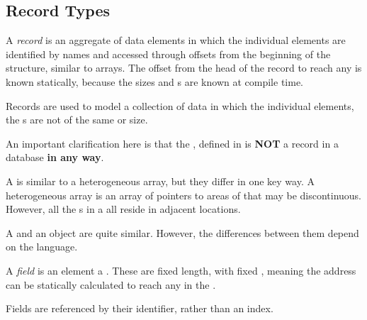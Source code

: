 \subsection{Record Types}\label{subsec:Record_Data_Types}
\begin{definition}[Record]\label{def:Record_Data_Type}
  A \emph{record} is an aggregate of data elements in which the individual elements are identified by names and accessed through offsets from the beginning of the structure, similar to arrays.
  The offset from the head of the record to reach any  is known statically, because the sizes and s are known at compile time.

  Records are used to model a collection of data in which the individual elements, the s are not of the same  or size.

  \begin{remark}[Clarification]
    An important clarification here is that the , defined in  is \textbf{NOT} a record in a database \textbf{in any way}.
  \end{remark}

  \begin{remark}
    A  is similar to a heterogeneous array, but they differ in one key way.
    A heterogeneous array is an array of pointers to areas of  that may be discontinuous.
    However, all the s in a  all reside in adjacent  locations.
  \end{remark}

  \begin{remark}
    A  and an object are quite similar.
    However, the differences between them depend on the language.
  \end{remark}
\end{definition}

\begin{definition}[Field]\label{def:Record_Data_Type_Field}
  A \emph{field} is an element a .
  These are fixed length, with fixed , meaning the  address can be statically calculated to reach any  in the .

  Fields are referenced by their identifier, rather than an index.
\end{definition}

